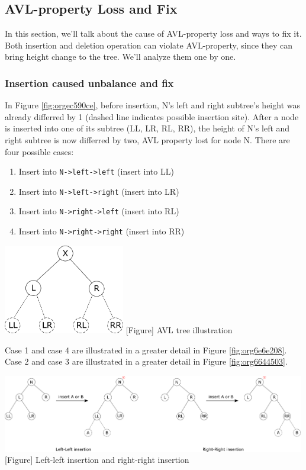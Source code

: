 \documentclass[12pt]{book}
\begin{document}
\subsection{AVL-property Loss and Fix}
\label{sec:org50377d9}
In this section, we'll talk about the cause of AVL-property loss and ways to fix it. Both insertion and deletion operation can violate AVL-property, since they can bring height change to the tree. We'll analyze them one by one.
\subsubsection{Insertion caused unbalance and fix}
\label{sec:org5f0b20e}
In Figure \ref{fig:orgec590ce}, before insertion, N's left and right subtree's height was already differred by 1 (dashed line indicates possible insertion site). After a node is inserted into one of its subtree (LL, LR, RL, RR), the height of N's left and right subtree is now differred by two, AVL property lost for node N. There are four possible cases:
\begin{enumerate}
\item Insert into \texttt{N->left->left} (insert into LL)
\item Insert into \texttt{N->left->right} (insert into LR)
\item Insert into \texttt{N->right->left} (insert into RL)
\item Insert into \texttt{N->right->right} (insert into RR)
\end{enumerate}


\begin{center}
\includegraphics[width=200px]{./img/AVL-illustration.pdf}
[Figure]{\label{fig:orgec590ce}
AVL tree illustration}
\end{center}

Case 1 and case 4 are illustrated in a greater detail in Figure \ref{fig:org6e6e208}. Case 2 and case 3 are illustrated in a greater detail in Figure \ref{fig:org6644503}.

\begin{center}
\includegraphics[width=500px]{./img/AVL-LL-RR-insertion.pdf}
[Figure]{\label{fig:org6e6e208}
Left-left insertion and right-right insertion}
\end{center}
\end{document}
